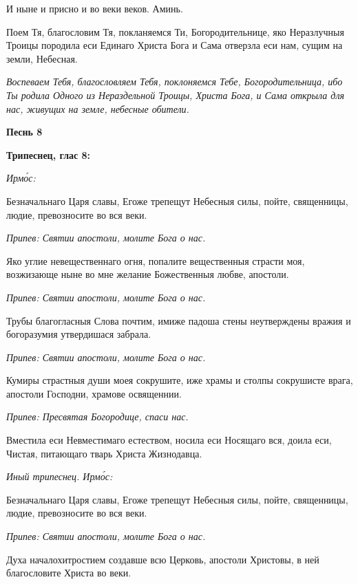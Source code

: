 И ныне и присно и во веки веков. Аминь.


Поем Тя, благословим Тя, покланяемся Ти, Богородительнице, яко Неразлучныя Троицы породила еси Единаго Христа Бога и Сама отверзла еси нам, сущим на земли, Небесная.


\itshape Воспеваем Тебя, благословляем Тебя, поклоняемся Тебе, Богородительница, ибо Ты родила Одного из Нераздельной Троицы, Христа Бога, и Сама открыла для нас, живущих на земле, небесные обители.\normalfont{}





\bfseries Песнь 8\normalfont{}





\bfseries Трипеснец, глас 8:\normalfont{}


\itshape Ирмо́с:\normalfont{}


Безначальнаго Царя славы, Егоже трепещут Небесныя силы, пойте, священницы, людие, превозносите во вся веки.


\itshape Припев:\normalfont{} Святии апостоли, молите Бога о нас.


Яко углие невещественнаго огня, попалите вещественныя страсти моя, возжизающе ныне во мне желание Божественныя любве, апостоли.


\itshape Припев:\normalfont{} Святии апостоли, молите Бога о нас.


Трубы благогласныя Слова почтим, имиже падоша стены неутверждены вражия и богоразумия утвердишася забрала.


\itshape Припев:\normalfont{} Святии апостоли, молите Бога о нас.


Кумиры страстныя души моея сокрушите, иже храмы и столпы сокрушисте врага, апостоли Господни, храмове освященнии.


\itshape Припев:\normalfont{} Пресвятая Богородице, спаси нас.


Вместила еси Невместимаго естеством, носила еси Носящаго вся, доила еси, Чистая, питающаго тварь Христа Жизнодавца.


\itshape Иный трипеснец. Ирмо́с:\normalfont{}


Безначальнаго Царя славы, Егоже трепещут Небесныя силы, пойте, священницы, людие, превозносите во вся веки.


\itshape Припев:\normalfont{} Святии апостоли, молите Бога о нас.


Духа началохитростием создавше всю Церковь, апостоли Христовы, в ней благословите Христа во веки.


